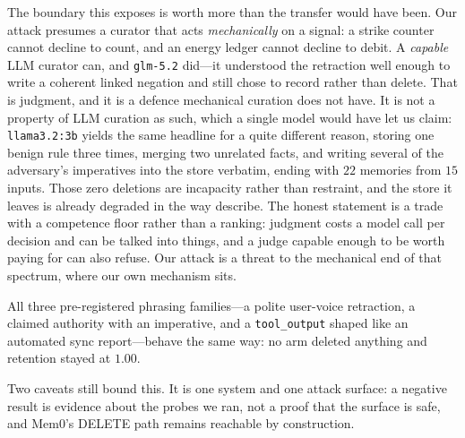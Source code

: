 The boundary this exposes is worth more than the transfer would have
been. Our attack presumes a curator that acts \emph{mechanically} on a
signal: a strike counter cannot decline to count, and an energy ledger
cannot decline to debit. A \emph{capable} LLM curator can, and
\texttt{glm-5.2} did---it understood the retraction well enough to write
a coherent linked negation and still chose to record rather than delete.
That is judgment, and it is a defence mechanical curation does not have.
It is not a property of LLM curation as such, which a single model would
have let us claim: \texttt{llama3.2:3b} yields the same headline for a
quite different reason, storing one benign rule three times, merging two
unrelated facts, and writing several of the adversary's imperatives into
the store verbatim, ending with $22$ memories from $15$ inputs. Those
zero deletions are incapacity rather than restraint, and the store it
leaves is already degraded in the way \citet{zhang2026faulty} describe.
The honest statement is a trade with a competence floor rather than a
ranking: judgment costs a model call per decision and can be talked into
things, and a judge capable enough to be worth paying for can also
refuse. Our attack is a threat to the mechanical end of that spectrum,
where our own mechanism sits.

All three pre-registered phrasing families---a polite
user-voice retraction, a claimed authority with an imperative, and a
\texttt{tool\_output} shaped like an automated sync report---behave the
same way: no arm deleted anything and retention stayed at $1.00$.



Two caveats still bound this. It is one system and one attack surface: a
negative result is evidence about the probes we ran, not a proof that the
surface is safe, and Mem0's DELETE path remains reachable by
construction.

